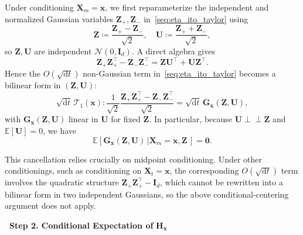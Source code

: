 Under conditioning $\bm X_m=\bm x$, we first reparameterize the independent and normalized Gaussian variables $\bm{Z}_+,\bm{Z}_-$ in~\eqref{seq:eta_ito_taylor} using
\begin{equation}
    \bm{Z}\coloneq\frac{\bm{Z}_+-\bm{Z}_-}{\sqrt{2}},
    \quad
    \bm{U}\coloneq\frac{\bm{Z}_++\bm{Z}_-}{\sqrt{2}},
    \label{seq:def_ZU}
\end{equation}
so $\bm{Z}, \bm{U}$ are independent $\mathcal{N}(0,\mathbf{I}_d)$. A direct algebra gives
\begin{equation*}
    \bm{Z}_+\bm{Z}_+^\intercal-\bm{Z}_-\bm{Z}_-^\intercal
    =\bm{Z}\bm{U}^\intercal+\bm{U}\bm{Z}^\intercal.
\end{equation*}
Hence the $O(\sqrt{\mathrm{d}t})$ non-Gaussian term in~\eqref{seq:eta_ito_taylor} becomes a bilinear form in $(\bm{Z},\bm{U})$:
\begin{equation*}
    \sqrt{\mathrm{d}t}\,\mathcal{T}_1(\bm{x}):
    \frac{1}{\sqrt 2}\frac{\bm{Z}_+\bm{Z}_+^\intercal-\bm{Z}_-\bm{Z}_-^\intercal}{\sqrt{2}}
    =\sqrt{\mathrm{d}t}\,\bm{G}_{\bm{x}}(\bm{Z},\bm{U}),
\end{equation*}
with $\bm{G}_{\bm{x}}(\bm{Z},\bm{U})$ linear in $\bm{U}$ for fixed $\bm{Z}$. In particular, because $\bm{U}\perp\!\!\!\perp\bm{Z}$ and $\mathbb{E}[\bm{U}]=0$, we have
\begin{equation}
    \mathbb{E}[\bm{G}_{\bm{x}}(\bm{Z},\bm{U})\,|\bm{X}_m=\bm{x},\bm{Z}\,]
    =\bm 0.
    \label{seq:G_cond_mean_zero}
\end{equation}

This cancellation relies crucially on midpoint conditioning. Under other conditionings, such as conditioning on $\bm{X}_t=\bm{x}$, the corresponding $O(\sqrt{\mathrm{d}t})$ term involves the quadratic structure $\bm{Z}_+\bm{Z}_+^\intercal-\mathbf{I}_d$, which cannot be rewritten into a bilinear form in two independent Gaussians, so the above conditional-centering argument does not apply.

\bigskip
\noindent\textbf{\textbullet\ Step 2. Conditional Expectation of} $\bm{H}_{\bm{x}}$

